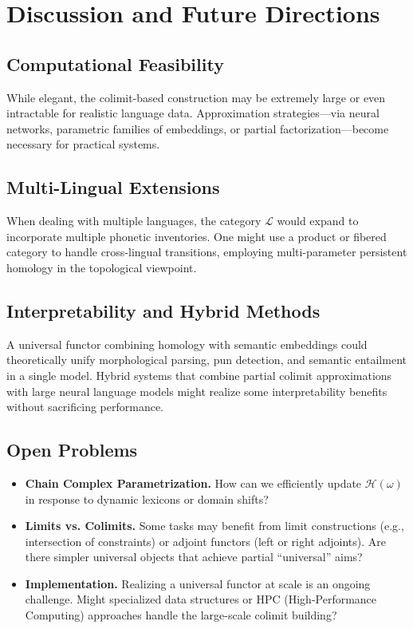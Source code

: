 \documentclass[11pt]{article}
\theoremstyle{definition}
\theoremstyle{remark}
\begin{document}
\section{Discussion and Future Directions}
\label{sec:discussion}

\subsection{Computational Feasibility}
While elegant, the colimit-based construction may be extremely large or even intractable for realistic language data. Approximation strategies—via neural networks, parametric families of embeddings, or partial factorization—become necessary for practical systems.

\subsection{Multi-Lingual Extensions}
When dealing with multiple languages, the category \(\mathcal{L}\) would expand to incorporate multiple phonetic inventories. One might use a product or fibered category to handle cross-lingual transitions, employing multi-parameter persistent homology in the topological viewpoint.

\subsection{Interpretability and Hybrid Methods}
A universal functor combining homology with semantic embeddings could theoretically unify morphological parsing, pun detection, and semantic entailment in a single model. Hybrid systems that combine partial colimit approximations with large neural language models might realize some interpretability benefits without sacrificing performance.

\subsection{Open Problems}
\begin{itemize}
    \item \textbf{Chain Complex Parametrization.} How can we efficiently update \(\mathcal{H}(\omega)\) in response to dynamic lexicons or domain shifts?
    \item \textbf{Limits vs. Colimits.} Some tasks may benefit from limit constructions (e.g., intersection of constraints) or adjoint functors (left or right adjoints). Are there simpler universal objects that achieve partial “universal” aims?
    \item \textbf{Implementation.} Realizing a universal functor at scale is an ongoing challenge. Might specialized data structures or HPC (High-Performance Computing) approaches handle the large-scale colimit building?
\end{itemize}
\end{document}
